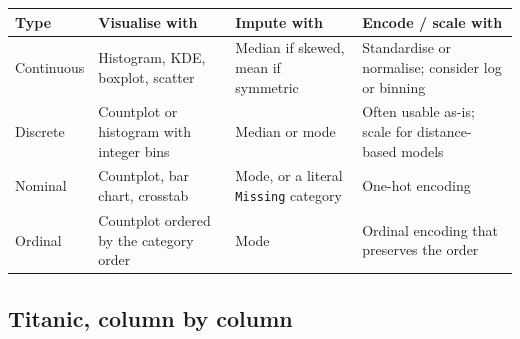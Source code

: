 \documentclass[11pt,a4paper]{article}
\begin{document}
\begin{tabularx}{\textwidth}{@{}l X X X@{}}
\toprule
\rowcolor{tablehead} \textbf{Type} & \textbf{Visualise with} & \textbf{Impute with} & \textbf{Encode / scale with} \\
\midrule
Continuous & Histogram, KDE, boxplot, scatter & Median if skewed, mean if symmetric & Standardise or normalise; consider log or binning \\
Discrete & Countplot or histogram with integer bins & Median or mode & Often usable as-is; scale for distance-based models \\
Nominal & Countplot, bar chart, crosstab & Mode, or a literal \texttt{Missing} category & One-hot encoding \\
Ordinal & Countplot ordered by the category order & Mode & Ordinal encoding that preserves the order \\
\bottomrule
\end{tabularx}


\subsection{Titanic, column by column}
\end{document}
